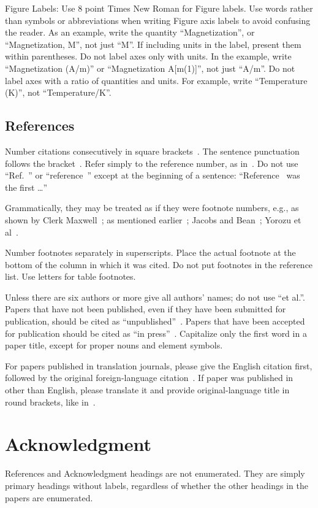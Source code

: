 \documentclass [a4paper,final,conference,10pt]{IDAACS}
\begin{document}
Figure Labels: Use 8 point Times New Roman for Figure labels. Use words rather
than symbols or abbreviations when writing Figure axis labels to avoid 
confusing the reader. As an example, write the quantity ``Magnetization'', or 
``Magnetization, M'', not just ``M''. If including units in the label, present
them within parentheses. Do not label axes only with units. In the example, 
write ``Magnetization (A/m)'' or ``Magnetization {A[m(1)]}'', not just ``A/m''.
Do not label axes with a ratio of quantities and units. For example, write 
``Temperature (K)'', not ``Temperature/K''.


\subsection{References}

Number citations consecutively in square brackets~\cite{publ1}.
The sentence punctuation follows the bracket~\cite{publ2}. Refer simply to the
reference number, as in~\cite{publ3}. Do not use ``Ref.~\cite{publ3}'' or 
``reference~\cite{publ3}'' except at the beginning of a sentence: 
``Reference~\cite{publ3} was the first \ldots{}''

Grammatically, they may be treated as if they were footnote numbers, e.g., 
as shown by Clerk Maxwell~\cite{publ2}; as mentioned earlier~\cite{publ7, 
publ2, publ3, publ4, publ6}; Jacobs and Bean~\cite{publ5}; Yorozu et 
al~\cite{publ6}.

Number footnotes separately in superscripts. Place the actual footnote at the 
bottom of the column in which it was cited. Do not put footnotes in the 
reference list. Use letters for table footnotes.

Unless there are six authors or more give all authors' names; do not use 
``et al.''. Papers that have not been published, even if they have been 
submitted for publication, should be cited as ``unpublished''~\cite{publ4}. 
Papers that have been accepted for publication should be cited as 
``in press''~\cite{publ5}. Capitalize only the first word in a paper title, 
except for proper nouns and element symbols.

For papers published in translation journals, please give the English citation 
first, followed by the original foreign-language citation~\cite{publ6}. If 
paper was published in other than English, please translate it and provide
original-language title in round brackets, like in~\cite{publ8}.

\section*{Acknowledgment}
References and Acknowledgment headings are not enumerated. They are simply 
primary headings without labels, regardless of whether the other headings 
in the papers are enumerated.
\end{document}
